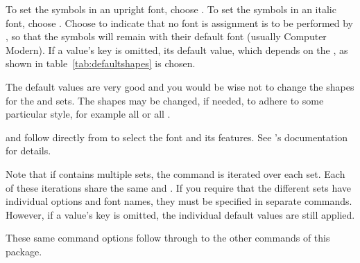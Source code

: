 \documentclass{ltxdockit}
\makeatletter
\def\topbottomrule{\noalign{\ifnum0=`}\fi \@aboverulesep=\aboverulesep
  \global\@belowrulesep=\belowrulesep \global\@thisruleclass=\@ne
  \@ifnextchar[{\@BTrule}{\@BTrule[\heavyrulewidth]}}
\makeatother
\begin{document}
\begin{ltxsyntax}
\begin{marglist}
\begin{optionlist}


\end{optionlist}
To set the symbols in an upright font, choose . To set
the symbols in an italic font, choose . Choose 
to indicate that no font is assignment is to be performed by
, so that the symbols will remain with their default
font (usually Computer Modern). If a value’s key is omitted, its
default value, which depends on the , as shown in
table~\ref{tab:defaultshapes} is chosen.

The default values are very good and you would be wise not to change
the shapes for the  and  sets. The 
shapes may be changed, if needed, to adhere to some particular style,
for example all  or all .

\begin{table}\centering
  \caption{The default shapes for the symbol sets.}\label{tab:defaultshapes}
\end{table}

\item[\smash{\begin{tabular}[t]{@{}r@{}}\prm{font features}\\\prm{font
        name}\end{tabular}}]  and 
  follow directly from  to select the font and its
  features. See ’s documentation for details.

\end{marglist}

Note that if  contains multiple sets, the command is
iterated over each set. Each of these iterations share the same
 and . If you require
that the different sets have individual options and font names, they
must be specified in separate commands. However, if a value’s key is
omitted, the individual default values are still applied.

These same command options follow through to the other commands of
this package.

\end{ltxsyntax}
\end{document}

